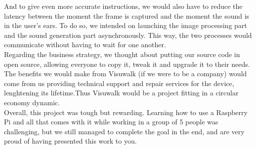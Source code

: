 \documentclass{rapport}
\begin{document}
And to give even more accurate instructions, we would also have to reduce the latency between the moment the frame is captured and the moment the sound is in the user's ears. To do so, we intended on launching the image processing part and the sound generation part asynchronously. This way, the two processes would communicate without having to wait for one another.\\
Regarding the business strategy, we thought about putting our source code in open source, allowing everyone to copy it, tweak it and upgrade it to their needs. The benefits we would make from Visuwalk (if we were to be a company) would come from us providing technical support and repair services for the device, lenghtening its lifetime.Thus Visuwalk would be a project fitting in a circular economy dynamic.\\
Overall, this project was tough but rewarding. Learning how to use a Raspberry Pi and all that comes with it while working in a group of 5 people was challenging, but we still managed to complete the goal in the end, and are very proud of having presented this work to you.
\end{document}
